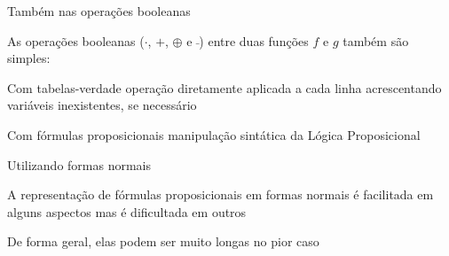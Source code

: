 \expandafter\documentclass\expandafter[table, usenames, svgnames, dvipsnames,14pt, \classopts]{beamer}
\begin{document}
\begin{frame}{Também nas operações booleanas}

    As operações booleanas ($\cdot$, $+$, $\oplus$ e $\bar{~}$) entre duas funções $f$ e $g$ também são simples:

    \begin{outline}
        \1 Com tabelas-verdade
            \2[-] operação diretamente aplicada a cada linha
            \2[-] acrescentando variáveis inexistentes, se necessário

        \vspace{1em}
            
        \1 Com fórmulas proposicionais
            \2[-] manipulação sintática da Lógica Proposicional
    \end{outline}

    \begin{center}
    \end{center}
    
\end{frame}

\begin{frame}{Utilizando formas normais}

    \begin{outline}
        \1 A representação de fórmulas proposicionais em formas normais é facilitada em alguns aspectos
            \2[-] mas é dificultada em outros
        
        \vspace{1em}
        
        \1 De forma geral, elas podem ser muito longas no pior caso
    \end{outline}
\end{frame}
\end{document}

